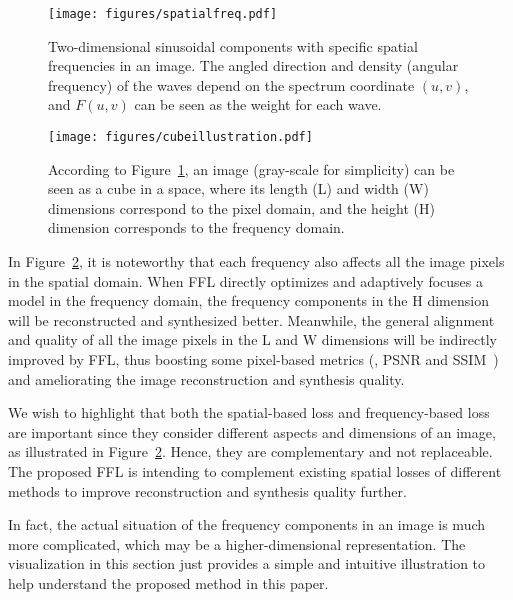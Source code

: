\documentclass[10pt,twocolumn,letterpaper]{article}
\begin{document}
\begin{figure}[t]
	\centering
\texttt{[image: figures/spatialfreq.pdf]}
\caption{Two-dimensional sinusoidal components with specific spatial frequencies in an image. The angled direction and density (angular frequency) of the waves depend on the spectrum coordinate $\left(u, v\right)$, and $F\left(u,v\right)$ can be seen as the weight for each wave.}
	\label{fig:spatialfreq}
	\vspace{-0.1cm}
\end{figure}


\begin{figure}[t]
	\centering
\texttt{[image: figures/cubeillustration.pdf]}
\caption{According to Figure~\ref{fig:spatialfreq}, an image (gray-scale for simplicity) can be seen as a cube in a space, where its length (L) and width (W) dimensions correspond to the pixel domain, and the height (H) dimension corresponds to the frequency domain.}
	\label{fig:cubeillustration}
	\vspace{-0.3cm}
\end{figure}


In Figure~\ref{fig:cubeillustration}, it is noteworthy that each frequency also affects all the image pixels in the spatial domain. When FFL directly optimizes and adaptively focuses a model in the frequency domain, the frequency components in the H dimension will be reconstructed and synthesized better. Meanwhile, the general alignment and quality of all the image pixels in the L and W dimensions will be indirectly improved by FFL, thus boosting some pixel-based metrics (\eg, PSNR and SSIM~\cite{ssim}) and ameliorating the image reconstruction and synthesis quality.

We wish to highlight that both the spatial-based loss and frequency-based loss are important since they consider different aspects and dimensions of an image, as illustrated in Figure~\ref{fig:cubeillustration}. Hence, they are complementary and not replaceable. The proposed FFL is intending to complement existing spatial losses of different methods to improve reconstruction and synthesis quality further.

In fact, the actual situation of the frequency components in an image is much more complicated, which may be a higher-dimensional representation. The visualization in this section just provides a simple and intuitive illustration to help understand the proposed method in this paper.
\end{document}
